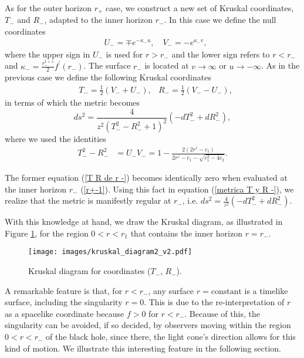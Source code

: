 \documentclass[sn-mathphys,Numbered]{sn-jnl}%
\theoremstyle{thmstyleone}%
\theoremstyle{thmstyletwo}%
\theoremstyle{thmstylethree}%
\begin{document}
As for the outer horizon $r_+$ case, we construct a new set of Kruskal coordinates, $T_-$ and $R_-$, adapted to the inner horizon $r_-$. In this case we define the null coordinates 
%
\begin{align} \label{coord Kruskal -}
&U_{-}=\mp e^{-\kappa_{-} u}, \quad V_{-}=-e^{\kappa_{-} v},
\end{align}
%
where the upper sign in $U_-$ is used for $r>r_-$ and the lower sign refers to $r<r_-$ and $\kappa_{-}=\frac{r_{-}^{1+z}}{2} f^{\prime}\left(r_{-}\right)$. The surface $r_-$ is located at $v\rightarrow \infty$ or $u\rightarrow -\infty$. As in the previous case we define the following Kruskal coordinates
%
 \begin{align} \label{T y R -}
       &T_{-}=\frac{1}{2}\left(V_- + U_-\right), &R_-=\frac{1}{2}\left(V_- - U_-\right),
   \end{align}
%
in terms of which the metric becomes
%
\begin{equation} \label{metrica T y R -}
    d s^2 =
    \frac{4}{z^2 \left(T_{-}^2-R_{-}^2+1\right)^2} \left(-dT_{-}^2+dR_{-}^2\right),
\end{equation}
%
where we used the identities
\begin{align}\label{T R de r -}
    T_{-}^2-R_{-}^2&= U_-V_-=
    1-\frac{2 \left(2r^z-c_1\right)}{2r^z-c_1-\sqrt{c_{1}^2-4c_2}}.
\end{align}

The former equation (\ref{T R de r -}) becomes identically zero when evaluated at the inner horizon $r_-$ (\ref{r+-1}). Using this fact in equation (\ref{metrica T y R -}), we realize that the metric is manifestly regular at $r_-$, i.e. $ds^2= \frac{4}{z^2} \left(-dT_-^2+ dR_-^2\right)$.  

With this knowledge at hand, we draw the Kruskal diagram, as illustrated in Figure \ref{kruskal diagram 2}, for the region $0<r<r_1$ that contains the inner horizon $r=r_-$. 
\begin{figure}
    \centering
    \texttt{[image: images/kruskal\_diagram2\_v2.pdf]}
    \caption{Kruskal diagram for coordinates ($T_-$, $R_-$).}
    \label{kruskal diagram 2}
\end{figure}
A remarkable feature is that, for $r<r_-$, any surface $r=\text{constant}$ is a timelike surface, including the singularity $r=0$. This is due to the re-interpretation of $r$ as a spacelike coordinate because $f>0$ for $r<r_-$. Because of this, the singularity can be avoided, if so decided, by observers moving within the region $0<r<r_-$ of the black hole, since there, the light cone's direction allows for this kind of motion. We illustrate this interesting feature in the following section.
\end{document}
